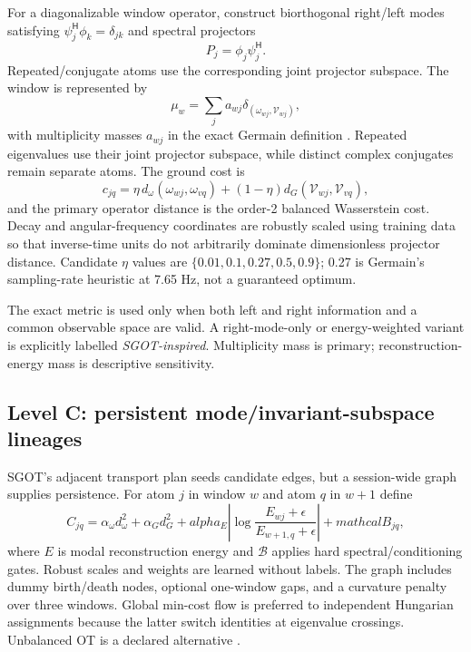 \documentclass[11pt,a4paper]{article}
\newcommand{\Hh}{^{\mathsf H}}
\begin{document}
For a diagonalizable window operator, construct biorthogonal right/left modes satisfying $\psi_j\Hh\phi_k=\delta_{jk}$ and spectral projectors
\begin{equation}
  P_j=\phi_j\psi_j\Hh.
\end{equation}
Repeated/conjugate atoms use the corresponding joint projector subspace. The window is represented by
\begin{equation}
  \mu_w=\sum_j a_{wj}\delta_{(\omega_{wj},\mathcal V_{wj})},
\end{equation}
with multiplicity masses $a_{wj}$ in the exact Germain definition \citep{germain2026}. Repeated eigenvalues use their joint projector subspace, while distinct complex conjugates remain separate atoms. The ground cost is
\begin{equation}
  c_{jq}=\eta\,d_\omega(\omega_{wj},\omega_{vq})+(1-\eta)d_G(\mathcal V_{wj},\mathcal V_{vq}),
\end{equation}
and the primary operator distance is the order-2 balanced Wasserstein cost. Decay and angular-frequency coordinates are robustly scaled using training data so that inverse-time units do not arbitrarily dominate dimensionless projector distance. Candidate $\eta$ values are $\{0.01,0.1,0.27,0.5,0.9\}$; 0.27 is Germain's sampling-rate heuristic at 7.65 Hz, not a guaranteed optimum.

The exact metric is used only when both left and right information and a common observable space are valid. A right-mode-only or energy-weighted variant is explicitly labelled \emph{SGOT-inspired}. Multiplicity mass is primary; reconstruction-energy mass is descriptive sensitivity.

\subsection{Level C: persistent mode/invariant-subspace lineages}

SGOT's adjacent transport plan seeds candidate edges, but a session-wide graph supplies persistence. For atom $j$ in window $w$ and atom $q$ in $w+1$ define
\begin{equation}
  C_{jq}=\alpha_\omega d_\omega^2+\alpha_Gd_G^2+alpha_E\left|\log\frac{E_{wj}+\epsilon}{E_{w+1,q}+\epsilon}\right|+mathcal B_{jq},
\end{equation}
where $E$ is modal reconstruction energy and $\mathcal B$ applies hard spectral/conditioning gates. Robust scales and weights are learned without labels. The graph includes dummy birth/death nodes, optional one-window gaps, and a curvature penalty over three windows. Global min-cost flow is preferred to independent Hungarian assignments because the latter switch identities at eigenvalue crossings. Unbalanced OT is a declared alternative \citep{chizat2018}.
\end{document}
